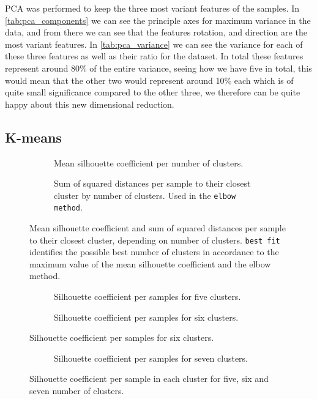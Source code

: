 PCA was performed to keep the three most variant features of the samples. In \ref{tab:pca_components} we can see the principle axes for maximum variance in the data, and from there we can see that the features rotation, and direction are the most variant features. In \ref{tab:pca_variance} we can see the variance for each of these three features as well as their ratio for the dataset. In total these features represent around 80\% of the entire variance, seeing how we have five in total, this would mean that the other two would represent around 10\% each which is of quite small significance compared to the other three, we therefore can be quite happy about this new dimensional reduction.


\subsection{K-means}

\begin{figure}
	\begin{subfigure}[b]{\textwidth}
		
		\caption{Mean silhouette coefficient per number of clusters.}
	\end{subfigure}
	\begin{subfigure}[b]{\textwidth}
		
		\caption{Sum of squared distances per sample to their closest cluster by number of clusters. Used in the \texttt{elbow method}.}
	\end{subfigure}
	\caption{Mean silhouette coefficient and sum of squared distances per sample to their closest cluster, depending on number of clusters. \texttt{best fit} identifies the possible best number of clusters in accordance to the maximum value of the mean silhouette coefficient and the elbow method.}
	\label{fig:kmeans_score}
\end{figure}

\begin{figure}
	\begin{subfigure}[b]{\textwidth}
		
		\caption{Silhouette coefficient per samples for five clusters.}
	\end{subfigure}
	\begin{subfigure}[b]{\textwidth}
		
		\caption{Silhouette coefficient per samples for six clusters.}
		\label{fig:silhouette_6}
	\end{subfigure}
\end{figure}
\begin{figure}
	\ContinuedFloat
	\begin{subfigure}[b]{\textwidth}
		
		\caption{Silhouette coefficient per samples for seven clusters.}
	\end{subfigure}
	\caption{Silhouette coefficient per sample in each cluster for five, six and seven number of clusters.}
	\label{fig:silhouette_coef}
\end{figure}

